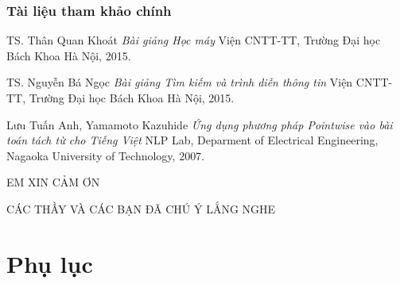 
\appendix

\begin{frame}
  \frametitle{Tài liệu tham khảo chính}
  \footnotesize{
    \begin{thebibliography}{99}

     TS. Thân Quan Khoát
      \newblock \emph{Bài giảng Học máy}
      \newblock Viện CNTT-TT, Trường Đại học Bách Khoa Hà Nội, 2015.

     TS. Nguyễn Bá Ngọc
      \newblock \emph{Bài giảng Tìm kiếm và trình diễn thông tin}
      \newblock Viện CNTT-TT, Trường Đại học Bách Khoa Hà Nội, 2015.

       Lưu Tuấn Anh, Yamamoto Kazuhide
        \newblock \emph{Ứng dụng phương pháp Pointwise vào bài toán tách từ cho Tiếng Việt}
        \newblock NLP Lab, Deparment of Electrical Engineering, Nagaoka University of Technology, 2007.

    \end{thebibliography}
  }
\end{frame}

\begin{frame}
  \Large{\centerline{EM XIN CẢM ƠN}}
  \Large{\centerline{CÁC THẦY VÀ CÁC BẠN ĐÃ CHÚ Ý LẮNG NGHE}}
\end{frame}


\section{Phụ lục}
